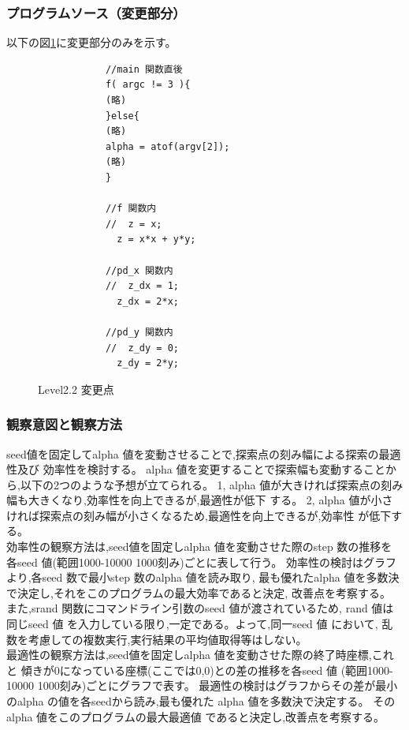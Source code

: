 \subsubsection{プログラムソース（変更部分）}
以下の図\ref{cp22}に変更部分のみを示す。
	\begin{figure}[H]
        \caption{Level2.2 変更点}
		\label{cp22}
		\fontsize{10pt}{10pt}\selectfont
      	\begin{shadebox}
        	\begin{verbatim}
			//main 関数直後
			f( argc != 3 ){
			(略)
			}else{
			(略)
			alpha = atof(argv[2]); 
			(略)
			}
			
			//f 関数内
			//  z = x;
			  z = x*x + y*y;

			//pd_x 関数内
			//  z_dx = 1;
			  z_dx = 2*x;

			//pd_y 関数内
			//  z_dy = 0;
			  z_dy = 2*y;
        	\end{verbatim}
      	\end{shadebox}
     \end{figure}

\subsubsection{観察意図と観察方法}
seed値を固定してalpha 値を変動させることで,探索点の刻み幅による探索の最適性及び
効率性を検討する。
alpha 値を変更することで探索幅も変動することから,以下の2つのような予想が立てられる。
1, alpha 値が大きければ探索点の刻み幅も大きくなり,効率性を向上できるが,最適性が低下
する。
2, alpha 値が小さければ探索点の刻み幅が小さくなるため,最適性を向上できるが,効率性
が低下する。\\
効率性の観察方法は,seed値を固定しalpha 値を変動させた際のstep 数の推移を
各seed 値(範囲1000-10000 1000刻み)ごとに表して行う。
効率性の検討はグラフより,各seed 数で最小step 数のalpha 値を読み取り,
最も優れたalpha 値を多数決で決定し,それをこのプログラムの最大効率であると決定,
改善点を考察する。\\
また,srand 関数にコマンドライン引数のseed 値が渡されているため,
rand 値は同じseed 値 を入力している限り,一定である。よって,同一seed 値 において,
乱数を考慮しての複数実行,実行結果の平均値取得等はしない。\\
最適性の観察方法は,seed値を固定しalpha 値を変動させた際の終了時座標,これと
傾きが0になっている座標(ここでは0,0)との差の推移を各seed 値
(範囲1000-10000 1000刻み)ごとにグラフで表す。
最適性の検討はグラフからその差が最小のalpha の値を各seedから読み,最も優れた
alpha 値を多数決で決定する。
そのalpha 値をこのプログラムの最大最適値 であると決定し,改善点を考察する。

